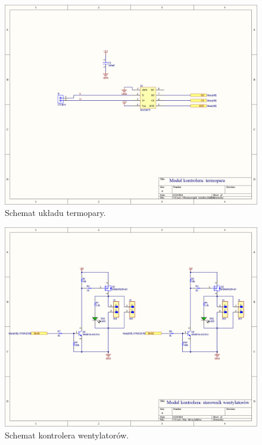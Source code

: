 \begin{figure}
    \begin{center}
        \includegraphics[width = 21cm]{zalaczniki/kontroler/Kontroler_Strona_02.jpg}
        \caption{Schemat układu termopary.}
    \end{center}
\end{figure}

\begin{figure}
    \begin{center}
        \includegraphics[width = 21cm]{zalaczniki/kontroler/Kontroler_Strona_03.jpg}
        \caption{Schemat kontrolera wentylatorów.}
    \end{center}
\end{figure}

